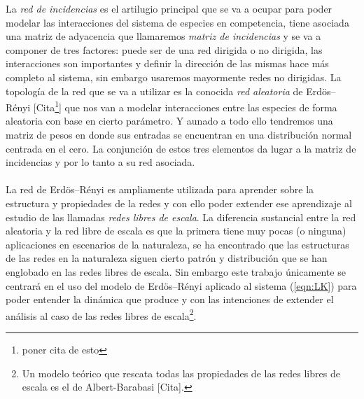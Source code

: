 La \textit{red de incidencias} es el artilugio principal que se va a ocupar para poder modelar las interacciones del sistema de especies en competencia, tiene asociada una matriz de adyacencia que llamaremos \textit{matriz de incidencias} y se va a componer de tres factores: puede ser de una red dirigida o no dirigida, las interacciones son importantes y definir la dirección de las mismas hace más completo al sistema, sin embargo usaremos mayormente redes no dirigidas. La topología de la red que se va a utilizar es la conocida \textit{red aleatoria} de Erdös–Rényi [Cita\footnote{poner cita de esto}] que nos van a modelar interacciones entre las especies de forma aleatoria con base en cierto parámetro. Y aunado a todo ello tendremos una matriz de pesos en donde sus entradas se encuentran en una distribución normal centrada en el cero. La conjunción de estos tres elementos da lugar a la matriz de incidencias y por lo tanto a su red asociada.\\
\\
La red de Erdös–Rényi es ampliamente utilizada para aprender sobre la estructura y propiedades de la redes y con ello poder extender ese aprendizaje al estudio de las llamadas \textit{redes libres de escala}. La diferencia sustancial entre la red aleatoria y la red libre de escala es que la primera tiene muy pocas (o ninguna) aplicaciones en escenarios de la naturaleza, se ha encontrado que las estructuras de las redes en la naturaleza siguen cierto patrón y distribución que se han englobado en las redes libres de escala. Sin embargo este trabajo únicamente se centrará en el uso del modelo de Erdös–Rényi aplicado al sistema (\ref{eqn:LK}) para poder entender la dinámica que produce y con las intenciones de extender el análisis al caso de las redes libres de escala\footnote{Un modelo teórico que rescata todas las propiedades de las redes libres de escala es el de Albert-Barabasi [Cita].}. 
